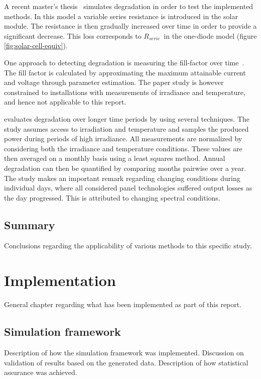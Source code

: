 A recent master's thesis~\cite{Zhao2010thesis} simulates degradation in order to test the implemented methods.
In this model a variable series resistance is introduced in the solar module.
The resistance is then gradually increased over time in order to provide a significant decrease.
This loss corresponds to $R_{serie}$ in the one-diode model (figure \ref{fig:solar-cell-equiv}).

One approach to detecting degradation is measuring the fill-factor over time~\cite{Raina2013}.
The fill factor is calculated by approximating the maximum attainable current and voltage through parameter estimation.
The paper study is however constrained to installations with measurements of irradiance and temperature, and hence not applicable to this report.

\cite{Makrides2010} evaluates degradation over longer time periods by using several techniques.
The study assumes access to irradiation and temperature and samples the produced power during periods of high irradiance.
All measurements are normalized by considering both the irradiance and temperature conditions.
These values are then averaged on a monthly basis using a least squares method.
Annual degradation can then be quantified by comparing months pairwise over a year.
The study makes an important remark regarding changing conditions during individual days, where all considered panel technologies suffered output losses as the day progressed.
This is attributed to changing spectral conditions.

\section{Summary}
Conclusions regarding the applicability of various methods to this specific study.

\chapter{Implementation}
General chapter regarding what has been implemented as part of this report.

\section{Simulation framework}
Description of how the simulation framework was implemented.
Discussion on validation of results based on the generated data.
Description of how statistical assurance was achieved.

